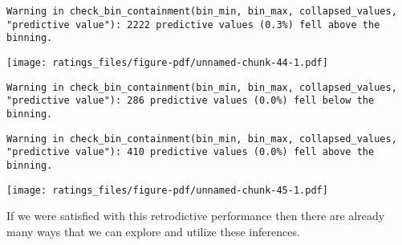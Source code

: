 \documentclass[
  letterpaper,
  DIV=11,
  numbers=noendperiod]{scrartcl}
\newenvironment{Shaded}{\begin{snugshade}}{\end{snugshade}}
\newcommand{\AttributeTok}[1]{\textcolor[rgb]{0.40,0.45,0.13}{#1}}
\newcommand{\DecValTok}[1]{\textcolor[rgb]{0.68,0.00,0.00}{#1}}
\newcommand{\FloatTok}[1]{\textcolor[rgb]{0.68,0.00,0.00}{#1}}
\newcommand{\FunctionTok}[1]{\textcolor[rgb]{0.28,0.35,0.67}{#1}}
\newcommand{\NormalTok}[1]{\textcolor[rgb]{0.00,0.23,0.31}{#1}}
\newcommand{\OtherTok}[1]{\textcolor[rgb]{0.00,0.23,0.31}{#1}}
\newcommand{\SpecialCharTok}[1]{\textcolor[rgb]{0.37,0.37,0.37}{#1}}
\newcommand{\StringTok}[1]{\textcolor[rgb]{0.13,0.47,0.30}{#1}}
\begin{document}
\begin{verbatim}
Warning in check_bin_containment(bin_min, bin_max, collapsed_values,
"predictive value"): 2222 predictive values (0.3%) fell above the binning.
\end{verbatim}

\texttt{[image: ratings\_files/figure-pdf/unnamed-chunk-44-1.pdf]}

\begin{Shaded}
\end{Shaded}

\begin{verbatim}
Warning in check_bin_containment(bin_min, bin_max, collapsed_values,
"predictive value"): 286 predictive values (0.0%) fell below the binning.
\end{verbatim}

\begin{verbatim}
Warning in check_bin_containment(bin_min, bin_max, collapsed_values,
"predictive value"): 410 predictive values (0.0%) fell above the binning.
\end{verbatim}

\texttt{[image: ratings\_files/figure-pdf/unnamed-chunk-45-1.pdf]}

If we were satisfied with this retrodictive performance then there are
already many ways that we can explore and utilize these inferences.
\end{document}
